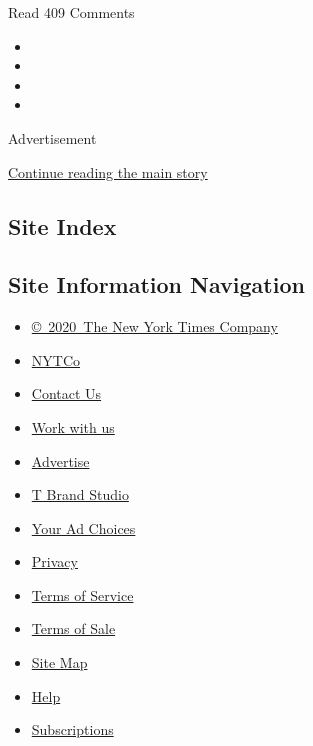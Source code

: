 Read 409 Comments

\begin{itemize}
\item
\item
\item
\item
\end{itemize}

Advertisement

\protect\hyperlink{after-bottom}{Continue reading the main story}

\hypertarget{site-index}{%
\subsection{Site Index}\label{site-index}}

\hypertarget{site-information-navigation}{%
\subsection{Site Information
Navigation}\label{site-information-navigation}}

\begin{itemize}
\tightlist
\item
  \href{https://help.nytimes.com/hc/en-us/articles/115014792127-Copyright-notice}{©~2020~The
  New York Times Company}
\end{itemize}

\begin{itemize}
\tightlist
\item
  \href{https://www.nytco.com/}{NYTCo}
\item
  \href{https://help.nytimes.com/hc/en-us/articles/115015385887-Contact-Us}{Contact
  Us}
\item
  \href{https://www.nytco.com/careers/}{Work with us}
\item
  \href{https://nytmediakit.com/}{Advertise}
\item
  \href{http://www.tbrandstudio.com/}{T Brand Studio}
\item
  \href{https://www.nytimes.com/privacy/cookie-policy\#how-do-i-manage-trackers}{Your
  Ad Choices}
\item
  \href{https://www.nytimes.com/privacy}{Privacy}
\item
  \href{https://help.nytimes.com/hc/en-us/articles/115014893428-Terms-of-service}{Terms
  of Service}
\item
  \href{https://help.nytimes.com/hc/en-us/articles/115014893968-Terms-of-sale}{Terms
  of Sale}
\item
  \href{https://spiderbites.nytimes.com}{Site Map}
\item
  \href{https://help.nytimes.com/hc/en-us}{Help}
\item
  \href{https://www.nytimes.com/subscription?campaignId=37WXW}{Subscriptions}
\end{itemize}
